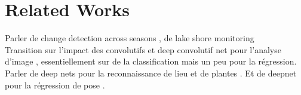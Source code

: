\section{Related Works}


Parler de change detection across seasons \cite{Neubert2013}, de lake shore monitoring \cite{Griffith2015,Griffith2015b,Griffith2014}\\

Transition sur l'impact des convolutifs \cite{farabet-pami-13} et deep convolutif net pour l'analyse d'image \cite{NIPS2012_4824,Simonyan14c}, essentiellement sur de la classification mais un peu pour la régression.\\

Parler de deep nets pour la reconnaissance de lieu \cite{Sunderhauf2015} et de plantes \cite{Reyes2015}. Et de deepnet pour la régression de pose \cite{conf/accv/PfisterSCZ14}.\\
